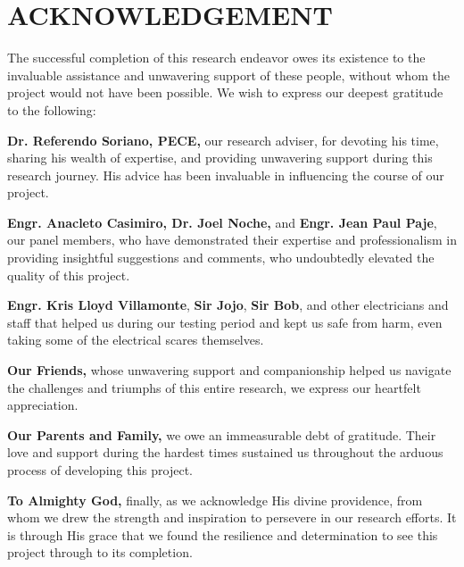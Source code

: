 \chapter*{ACKNOWLEDGEMENT}
The successful completion of this research endeavor owes its existence
to the invaluable assistance and unwavering support of these people,
without whom the project would not have been possible. We wish to
express our deepest gratitude to the following:

\textbf{Dr. Referendo Soriano, PECE,} our research adviser, for devoting
his time, sharing his wealth of expertise, and providing unwavering
support during this research journey. His advice has been invaluable in
influencing the course of our project.

\textbf{Engr. Anacleto Casimiro, Dr. Joel Noche,} and \textbf{Engr. Jean
Paul Paje}, our panel members, who have demonstrated their expertise and
professionalism in providing insightful suggestions and comments, who
undoubtedly elevated the quality of this project.

\textbf{Engr. Kris Lloyd Villamonte}, \textbf{Sir Jojo}, \textbf{Sir
Bob}, and other electricians and staff that helped us during our testing
period and kept us safe from harm, even taking some of the electrical
scares themselves.

\textbf{Our Friends,} whose unwavering support and companionship helped
us navigate the challenges and triumphs of this entire research, we
express our heartfelt appreciation.

\textbf{Our Parents and Family,} we owe an immeasurable debt of
gratitude. Their love and support during the hardest times sustained us
throughout the arduous process of developing this project.

\textbf{To Almighty God,} finally, as we acknowledge His divine
providence, from whom we drew the strength and inspiration to persevere
in our research efforts. It is through His grace that we found the
resilience and determination to see this project through to its
completion.
